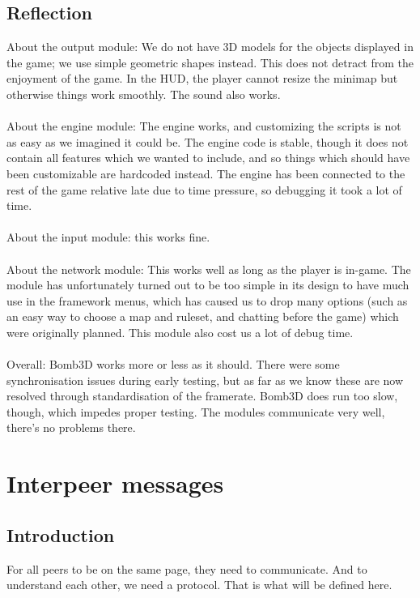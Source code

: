 
    \subsection{Reflection}
    
    About the output module: We do not have 3D models for the objects displayed in the game; we use simple geometric shapes instead. This does not detract from the enjoyment of the game. In the HUD, the player cannot resize the minimap but otherwise things work smoothly. The sound also works.\\
\\
    About the engine module: The engine works, and customizing the scripts is not as easy as we imagined it could be. The engine code is stable, though it does not contain all features which we wanted to include, and so things which should have been customizable are hardcoded instead. The engine has been connected to the rest of the game relative late due to time pressure, so debugging it took a lot of time.\\
\\
    About the input module: this works fine.\\
\\
    About the network module: This works well as long as the player is in-game. The module has unfortunately turned out to be too simple in its design to have much use in the framework menus, which has caused us to drop many options (such as an easy way to choose a map and ruleset, and chatting before the game) which were originally planned. This module also cost us a lot of debug time.\\
\\
    Overall: Bomb3D works more or less as it should. There were some synchronisation issues during early testing, but as far as we know these are now resolved through standardisation of the framerate. Bomb3D does run too slow, though, which impedes proper testing. The modules communicate very well, there's no problems there.\\        
         

    \section{Interpeer messages}
    \subsection{Introduction}
    For all peers to be on the same page, they need to communicate. And to understand each other, we need a protocol. That is what will be defined here.

